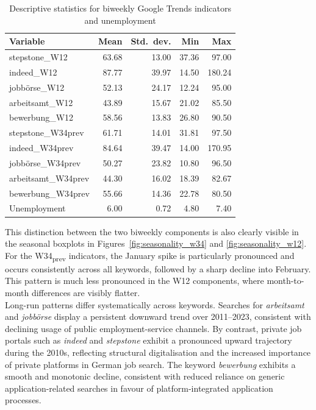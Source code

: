\documentclass[12pt,a4paper]{article}
\begin{document}
\begin{table}[ht]
\centering
\caption{Descriptive statistics for biweekly Google Trends indicators and unemployment}
\label{tab:descriptives}
\begin{tabular}{lrrrr}
\toprule
Variable & Mean & Std.\ dev. & Min & Max \\
\midrule
stepstone\_W12      & 63.68 & 13.00 & 37.36 & 97.00 \\
indeed\_W12         & 87.77 & 39.97 & 14.50 & 180.24 \\
jobbörse\_W12       & 52.13 & 24.17 & 12.24 & 95.00 \\
arbeitsamt\_W12     & 43.89 & 15.67 & 21.02 & 85.50 \\
bewerbung\_W12      & 58.56 & 13.83 & 26.80 & 90.50 \\
stepstone\_W34prev  & 61.71 & 14.01 & 31.81 & 97.50 \\
indeed\_W34prev     & 84.64 & 39.47 & 14.00 & 170.95 \\
jobbörse\_W34prev   & 50.27 & 23.82 & 10.80 & 96.50 \\
arbeitsamt\_W34prev & 44.30 & 16.02 & 18.39 & 82.67 \\
bewerbung\_W34prev  & 55.66 & 14.36 & 22.78 & 80.50 \\
Unemployment        &  6.00 &  0.72 &  4.80 &  7.40 \\
\bottomrule
\end{tabular}
\end{table}
This distinction between the two biweekly components is also clearly visible in the seasonal boxplots in Figures~\ref{fig:seasonality_w34} and \ref{fig:seasonality_w12}. For the W34\textsubscript{prev} indicators, the January spike is particularly pronounced and occurs consistently across all keywords, followed by a sharp decline into February. This pattern is much less pronounced in the W12 components, where month-to-month differences are visibly flatter.\\
Long-run patterns differ systematically across keywords. Searches for \textit{arbeitsamt} and \textit{jobbörse} display a persistent downward trend over 2011--2023, consistent with declining usage of public employment-service channels. By contrast, private job portals such as \textit{indeed} and \textit{stepstone} exhibit a pronounced upward trajectory during the 2010s, reflecting structural digitalisation and the increased importance of private platforms in German job search. The keyword \textit{bewerbung} exhibits a smooth and monotonic decline, consistent with reduced reliance on generic application-related searches in favour of platform-integrated application processes.\\
\end{document}
